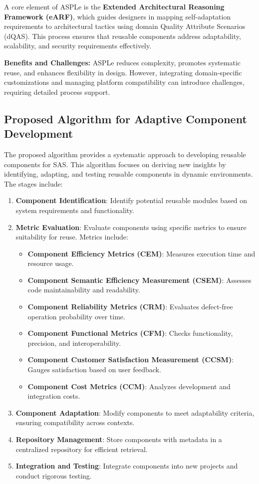 \documentclass[a4paper,10pt]{article}
\begin{document}
A core element of ASPLe is the \textbf{Extended Architectural Reasoning Framework (eARF)}, which guides designers in mapping self-adaptation requirements to architectural tactics using domain Quality Attribute Scenarios (dQAS). This process ensures that reusable components address adaptability, scalability, and security requirements effectively. 

\textbf{Benefits and Challenges:} ASPLe reduces complexity, promotes systematic reuse, and enhances flexibility in design. However, integrating domain-specific customizations and managing platform compatibility can introduce challenges, requiring detailed process support.

\subsection{Proposed Algorithm for Adaptive Component Development}

The proposed algorithm provides a systematic approach to developing reusable components for SAS. This algorithm focuses on deriving new insights by identifying, adapting, and testing reusable components in dynamic environments. The stages include:

\begin{enumerate}
    \item \textbf{Component Identification}: Identify potential reusable modules based on system requirements and functionality.
    \item \textbf{Metric Evaluation}: Evaluate components using specific metrics to ensure suitability for reuse. Metrics include:
        \begin{itemize}
            \item \textbf{Component Efficiency Metrics (CEM)}: Measures execution time and resource usage.
            \item \textbf{Component Semantic Efficiency Measurement (CSEM)}: Assesses code maintainability and readability.
            \item \textbf{Component Reliability Metrics (CRM)}: Evaluates defect-free operation probability over time.
            \item \textbf{Component Functional Metrics (CFM)}: Checks functionality, precision, and interoperability.
            \item \textbf{Component Customer Satisfaction Measurement (CCSM)}: Gauges satisfaction based on user feedback.
            \item \textbf{Component Cost Metrics (CCM)}: Analyzes development and integration costs.
        \end{itemize}
    \item \textbf{Component Adaptation}: Modify components to meet adaptability criteria, ensuring compatibility across contexts.
    \item \textbf{Repository Management}: Store components with metadata in a centralized repository for efficient retrieval.
    \item \textbf{Integration and Testing}: Integrate components into new projects and conduct rigorous testing.
\end{enumerate}
\end{document}
